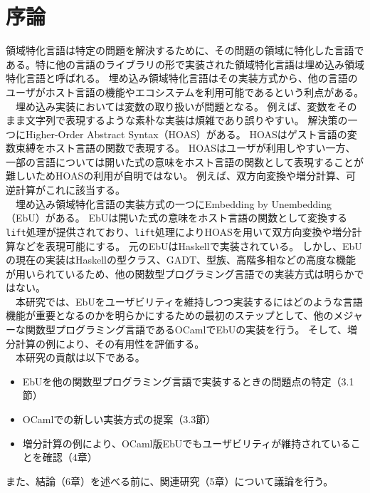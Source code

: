 \documentclass[uplatex]{sumiilab-paper}
\theoremstyle{mystyle}
\numberwithin{definition}{chapter} %
\begin{document}
\chapter{序論}
領域特化言語は特定の問題を解決するために、その問題の領域に特化した言語である。特に他の言語のライブラリの形で実装された領域特化言語は埋め込み領域特化言語と呼ばれる。
埋め込み領域特化言語はその実装方式から、他の言語のユーザがホスト言語の機能やエコシステムを利用可能であるという利点がある。\\
　埋め込み実装においては変数の取り扱いが問題となる。
例えば、変数をそのまま文字列で表現するような素朴な実装は煩雑であり誤りやすい。
解決策の一つにHigher-Order Abstract Syntax（HOAS）\cite{Church_1940,huet_hoas,miller_hoas,phenning_hoas}がある。
HOASはゲスト言語の変数束縛をホスト言語の関数で表現する。
HOASはユーザが利用しやすい一方、一部の言語については開いた式の意味をホスト言語の関数として表現することが難しいためHOASの利用が自明ではない。
例えば、双方向変換や増分計算、可逆計算がこれに該当する。\\
　埋め込み領域特化言語の実装方式の一つにEmbedding by Unembedding（EbU）\cite{matsuda2023embedding}がある。
EbUは開いた式の意味をホスト言語の関数として変換する{\tt lift}処理が提供されており、{\tt lift}処理によりHOASを用いて双方向変換や増分計算などを表現可能にする。
元のEbUはHaskellで実装されている。
しかし、EbUの現在の実装はHaskellの型クラス、GADT、型族、高階多相などの高度な機能が用いられているため、他の関数型プログラミング言語での実装方式は明らかではない。\\
　本研究では、EbUをユーザビリティを維持しつつ実装するにはどのような言語機能が重要となるのかを明らかにするための最初のステップとして、他のメジャーな関数型プログラミング言語であるOCamlでEbUの実装を行う。
そして、増分計算の例により、その有用性を評価する。\\
　本研究の貢献は以下である。
\begin{itemize}
  \item EbUを他の関数型プログラミング言語で実装するときの問題点の特定（3.1節）
  \item OCamlでの新しい実装方式の提案（3.3節）
  \item 増分計算の例により、OCaml版EbUでもユーザビリティが維持されていることを確認（4章）
\end{itemize}
また、結論（6章）を述べる前に、関連研究（5章）について議論を行う。
\end{document}
